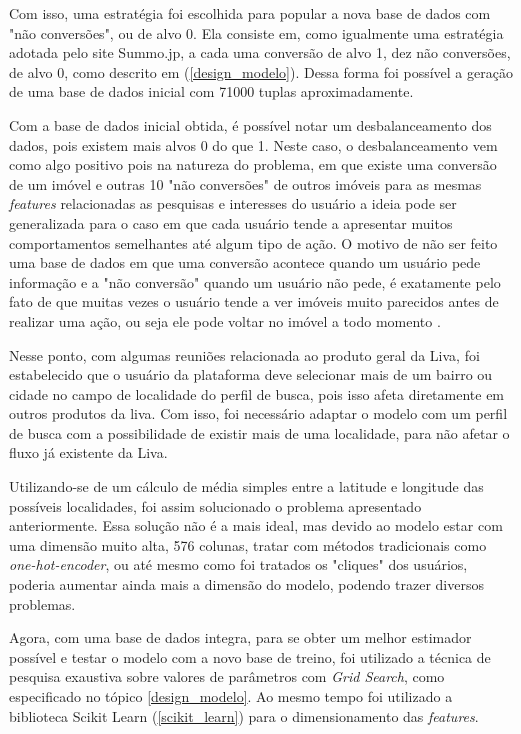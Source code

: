 Com isso, uma estratégia foi escolhida para popular a nova base de dados com "não conversões", ou de alvo 0. Ela consiste em, como igualmente uma estratégia adotada pelo site Summo.jp, a cada uma conversão de alvo 1, dez não conversões, de alvo 0, como descrito em (\ref{design_modelo}). Dessa forma foi possível a geração de uma base de dados inicial com 71000 tuplas aproximadamente.

Com a base de dados inicial obtida, é possível notar um desbalanceamento dos dados, pois existem mais alvos 0 do que 1. Neste caso, o desbalanceamento vem como algo positivo pois na natureza do problema, em que existe uma conversão de um imóvel e outras 10 "não conversões" de outros imóveis para as mesmas \textit{features} relacionadas as pesquisas e interesses do usuário a ideia pode ser generalizada para o caso em que cada usuário tende a apresentar muitos comportamentos semelhantes até algum tipo de ação. O motivo de não ser feito uma base de dados em que uma conversão acontece quando um usuário pede informação e a "não conversão" quando um usuário não pede, é exatamente pelo fato de que muitas vezes o usuário tende a ver imóveis muito parecidos antes de realizar uma ação, ou seja ele pode voltar no imóvel a todo momento \cite{Summo:2017}.

Nesse ponto, com algumas reuniões relacionada ao produto geral da Liva, foi estabelecido que o usuário da plataforma deve selecionar mais de um bairro ou cidade no campo de localidade do perfil de busca, pois isso afeta diretamente em outros produtos da liva. Com isso, foi necessário adaptar o modelo com um perfil de busca com a possibilidade de existir mais de uma localidade, para não afetar o fluxo já existente da Liva.

Utilizando-se de um cálculo de média simples entre a latitude e longitude das possíveis localidades, foi assim solucionado o problema apresentado anteriormente. Essa solução não é a mais ideal, mas devido ao modelo estar com uma dimensão muito alta, 576 colunas, tratar com métodos tradicionais como \textit{one-hot-encoder}, ou até mesmo como foi tratados os "cliques" dos usuários, poderia aumentar ainda mais a dimensão do modelo, podendo trazer diversos problemas.

Agora, com uma base de dados integra, para se obter um melhor estimador possível e testar o modelo com a novo base de treino, foi utilizado a técnica de pesquisa exaustiva sobre valores de parâmetros com \textit{Grid Search}, como especificado no tópico \ref{design_modelo}. Ao mesmo tempo foi utilizado a biblioteca Scikit Learn (\ref{scikit_learn}) para o dimensionamento das \textit{features}.

